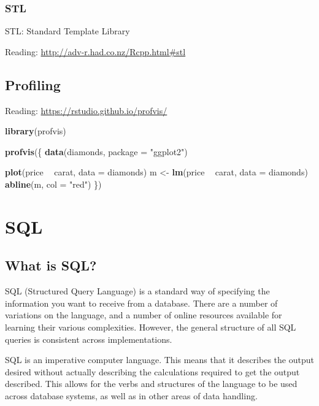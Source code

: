 \documentclass[]{book}
\newenvironment{Shaded}{\begin{snugshade}}{\end{snugshade}}
\newcommand{\KeywordTok}[1]{\textcolor[rgb]{0.13,0.29,0.53}{\textbf{#1}}}
\newcommand{\DataTypeTok}[1]{\textcolor[rgb]{0.13,0.29,0.53}{#1}}
\newcommand{\StringTok}[1]{\textcolor[rgb]{0.31,0.60,0.02}{#1}}
\newcommand{\OperatorTok}[1]{\textcolor[rgb]{0.81,0.36,0.00}{\textbf{#1}}}
\newcommand{\NormalTok}[1]{#1}
\theoremstyle{definition}
\theoremstyle{definition}
\theoremstyle{definition}
\theoremstyle{remark}
\begin{document}
\subsection{STL}\label{stl}

STL: Standard Template Library

Reading: \url{http://adv-r.had.co.nz/Rcpp.html\#stl}

\section{Profiling}\label{profiling}

Reading: \url{https://rstudio.github.io/profvis/}

\begin{Shaded}
\begin{Highlighting}[]
\KeywordTok{library}\NormalTok{(profvis)}

\KeywordTok{profvis}\NormalTok{(\{}
  \KeywordTok{data}\NormalTok{(diamonds, }\DataTypeTok{package =} \StringTok{"ggplot2"}\NormalTok{)}

  \KeywordTok{plot}\NormalTok{(price }\OperatorTok{~}\StringTok{ }\NormalTok{carat, }\DataTypeTok{data =}\NormalTok{ diamonds)}
\NormalTok{  m <-}\StringTok{ }\KeywordTok{lm}\NormalTok{(price }\OperatorTok{~}\StringTok{ }\NormalTok{carat, }\DataTypeTok{data =}\NormalTok{ diamonds)}
  \KeywordTok{abline}\NormalTok{(m, }\DataTypeTok{col =} \StringTok{"red"}\NormalTok{)}
\NormalTok{\})}
\end{Highlighting}
\end{Shaded}

\chapter{SQL}\label{databases}

\section{What is SQL?}\label{what-is-sql}

SQL (Structured Query Language) is a standard way of specifying the
information you want to receive from a database. There are a number of
variations on the language, and a number of online resources available
for learning their various complexities. However, the general structure
of all SQL queries is consistent across implementations.

SQL is an imperative computer language. This means that it describes the
output desired without actually describing the calculations required to
get the output described. This allows for the verbs and structures of
the language to be used across database systems, as well as in other
areas of data handling.
\end{document}
